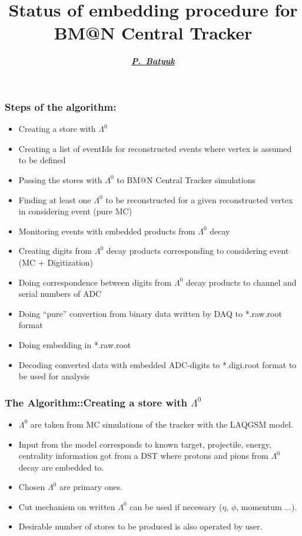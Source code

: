 \documentclass[dvipsnames] {beamer}
\title[\bf BERDS Meeting, March 5]
      {\textbf{\large {{\color{darkred!70!black} Status of embedding procedure for \\ BM@N Central Tracker}}}}
\author[\bf P.~Batyuk]{\textit{\textbf{{\footnotesize \underline{P.~Batyuk}}}}}
\begin{document}
      \maketitle

       \begin{frame}
         \frametitle{\bf \centering Steps of the algorithm:}
         \bf \footnotesize
         \begin{itemize}
         \item Creating a store with $\Lambda^{0}$
         \item Creating a list of eventIds for reconstructed events where vertex is assumed to be defined
         \item Passing the stores with $\Lambda^{0}$ to BM@N Central Tracker simulations
         \item Finding at least one $\Lambda^{0}$ to be reconstructed for a given reconstructed vertex in considering event (pure MC)
         \item Monitoring events with embedded products from $\Lambda^{0}$ decay
         \item Creating digits from $\Lambda^{0}$ decay products corresponding to considering event (MC + Digitization)
         \item Doing correspondence between digits from $\Lambda^{0}$ decay products to channel and serial numbers of ADC
         \item Doing ``pure'' convertion from binary data written by DAQ to *.raw.root format
         \item Doing embedding in *.raw.root
         \item Decoding converted data with embedded ADC-digits to *.digi.root format to be used for analysis
         \end{itemize}
       \end{frame}

        \begin{frame}
          \frametitle{\bf \centering The Algorithm::Creating a store with $\Lambda^{0}$}
          \bf
          \begin{itemize}
          \item $\Lambda^{0}$ are taken from MC simulations of the tracker with the LAQGSM model.
          \item Input from the model corresponds to known target, projectile, energy, centrality information got from
            a DST where protons and pions from $\Lambda^{0}$ decay are embedded to.
          \item Chosen $\Lambda^{0}$ are primary ones.
          \item Cut mechanism on written $\Lambda^{0}$ can be used if necessary ($\eta$, $\phi$, momentum ...).
          \item Desirable number of stores to be produced is also operated by user.
          \end{itemize}

        \end{frame}
\end{document}
